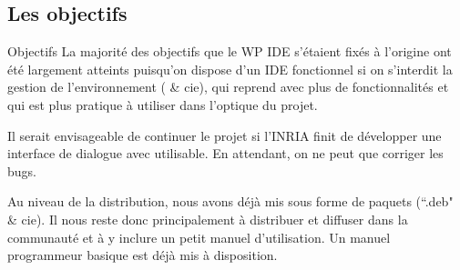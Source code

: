 \subsection{Les objectifs}

    \begin{frame}{Objectifs}
        La majorité des objectifs que le WP IDE s'étaient fixés à l'origine ont été largement atteints puisqu'on dispose d'un IDE fonctionnel si on s'interdit la gestion de l'environnement ( \& cie),  qui reprend \coqide{} avec plus de fonctionnalités et qui est plus pratique à utiliser dans l'optique du projet.

        Il serait envisageable de continuer le projet si l'INRIA finit de développer une interface de dialogue avec \coq{} utilisable.
En attendant, on ne peut que corriger les bugs.

        Au niveau de la distribution, nous avons déjà mis \coquille{} sous forme de paquets (``.deb" \& cie). Il nous reste donc principalement à distribuer et diffuser \coquille{} dans la communauté \coq{} et à y inclure un petit manuel d'utilisation. Un manuel programmeur basique est déjà mis à disposition.
    \end{frame}
